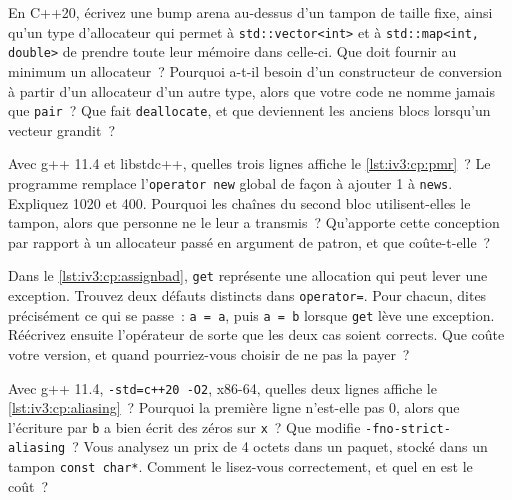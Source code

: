 \begin{question}\label{iq:iv3:cpp:44}
En C++20, écrivez une bump arena au-dessus d'un tampon de taille fixe, ainsi qu'un type d'allocateur qui permet à \texttt{std::vector<int>} et à \texttt{std::map<int, double>} de prendre toute leur mémoire dans celle-ci. Que doit fournir au minimum un allocateur~? Pourquoi a-t-il besoin d'un constructeur de conversion à partir d'un allocateur d'un autre type, alors que votre code ne nomme jamais que \texttt{pair}~? Que fait \texttt{deallocate}, et que deviennent les anciens blocs lorsqu'un vecteur grandit~?
\end{question}

\begin{question}\label{iq:iv3:cpp:45}
Avec g++ 11.4 et libstdc++, quelles trois lignes affiche le \cref{lst:iv3:cp:pmr}~? Le programme remplace l'\texttt{operator new} global de façon à ajouter 1 à \texttt{news}. Expliquez 1020 et 400. Pourquoi les chaînes du second bloc utilisent-elles le tampon, alors que personne ne le leur a transmis~? Qu'apporte cette conception par rapport à un allocateur passé en argument de patron, et que coûte-t-elle~?
\label{lst:iv3:cp:pmr}
\end{question}

\begin{question}\label{iq:iv3:cpp:46}
Dans le \cref{lst:iv3:cp:assignbad}, \texttt{get} représente une allocation qui peut lever une exception. Trouvez deux défauts distincts dans \texttt{operator=}. Pour chacun, dites précisément ce qui se passe~: \texttt{a = a}, puis \texttt{a = b} lorsque \texttt{get} lève une exception. Réécrivez ensuite l'opérateur de sorte que les deux cas soient corrects. Que coûte votre version, et quand pourriez-vous choisir de ne pas la payer~?
\label{lst:iv3:cp:assignbad}
\end{question}

\begin{question}\label{iq:iv3:cpp:47}
Avec g++ 11.4, \texttt{-std=c++20 -O2}, x86-64, quelles deux lignes affiche le \cref{lst:iv3:cp:aliasing}~? Pourquoi la première ligne n'est-elle pas 0, alors que l'écriture par \texttt{b} a bien écrit des zéros sur \texttt{x}~? Que modifie \texttt{-fno-strict-aliasing}~? Vous analysez un prix de 4 octets dans un paquet, stocké dans un tampon \texttt{const char*}. Comment le lisez-vous correctement, et quel en est le coût~?
\label{lst:iv3:cp:aliasing}
\end{question}

